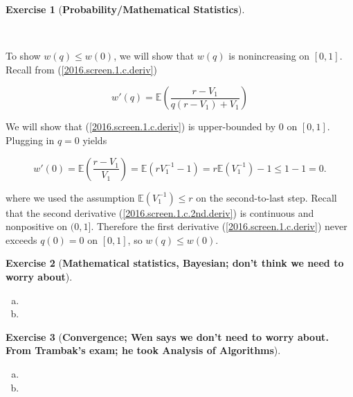 \documentclass{article}
\theoremstyle{definition}
\newtheorem{exercise}{Exercise}
\theoremstyle{definition}
\theoremstyle{definition}
\theoremstyle{definition}
\newcommand{\E}{\mathbb{E}}
\begin{document}
\begin{exercise}[\textbf{Probability/Mathematical Statistics}]
\begin{enumerate}[(a)]
\

To show \(w(q) \leq w(0)\), we will show that \(w(q)\) is nonincreasing on \([0, 1]\). Recall from (\ref{2016.screen.1.c.deriv}) 

\[
w'(q) = \E  \left( \frac{r - V_1}{q(r - V_1) + V_1} \right)
\]

We will show that (\ref{2016.screen.1.c.deriv}) is upper-bounded by 0 on \([0,1]\). Plugging in \(q = 0\) yields

\[
w'(0) = \E  \left( \frac{r - V_1}{ V_1} \right) = \E  \left( r V_1^{-1} - 1 \right)  = r \E  \left(V_1^{-1}\right)  - 1 \leq 1 - 1 = 0.
\]

where we used the assumption \(\E\left(V_1^{-1}\right)  \leq r\) on the second-to-last step. Recall that the second derivative (\ref{2016.screen.1.c.2nd.deriv}) is continuous and nonpositive on \((0,1]\). Therefore the first derivative (\ref{2016.screen.1.c.deriv}) never exceeds \(q(0) = 0\) on \([0,1]\), so \(w(q) \leq w(0)\).


\end{enumerate}

\end{exercise}

\begin{exercise}[\textbf{Mathematical statistics, Bayesian; don't think we need to worry about}]

\begin{enumerate}[(a)]

\item

\item

\end{enumerate}

\end{exercise}

\begin{exercise}[\textbf{Convergence; Wen says we don't need to worry about. From Trambak's exam; he took Analysis of Algorithms}]

\begin{enumerate}[(a)]

\item

\item

\end{enumerate}

\end{exercise}
\end{document}
